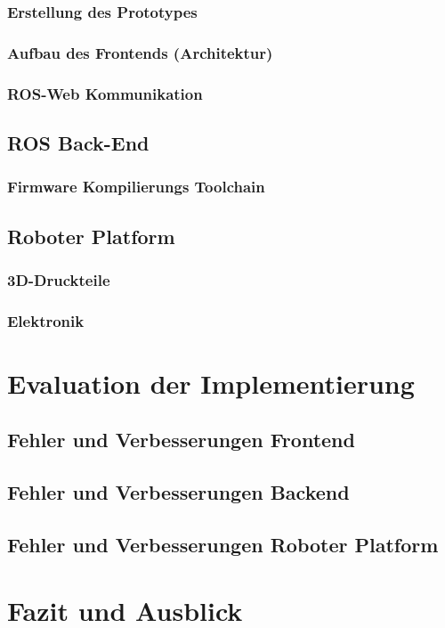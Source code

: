 \documentclass[11pt,twoside,a4paper,titlepage]{article}
\begin{document}
\subsubsection{Erstellung des Prototypes}


\subsubsection{Aufbau des Frontends (Architektur)}


\subsubsection{ROS-Web Kommunikation}



\subsection{ROS Back-End}
\subsubsection{Firmware Kompilierungs Toolchain}



\pagebreak
\subsection{Roboter Platform}
\subsubsection{3D-Druckteile}


\subsubsection{Elektronik}


\section{Evaluation der Implementierung}

\subsection{Fehler und Verbesserungen Frontend}

\subsection{Fehler und Verbesserungen Backend}


\subsection{Fehler und Verbesserungen Roboter Platform}


\section{Fazit und Ausblick}
\end{document}
